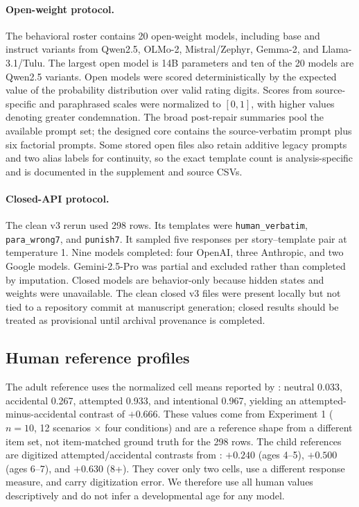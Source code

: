 \paragraph{Open-weight protocol.}
The behavioral roster contains 20 open-weight models, including base and instruct variants from Qwen2.5, OLMo-2, Mistral/Zephyr, Gemma-2, and Llama-3.1/Tulu.
The largest open model is 14B parameters and ten of the 20 models are Qwen2.5 variants.
Open models were scored deterministically by the expected value of the probability distribution over valid rating digits.
Scores from source-specific and paraphrased scales were normalized to $[0,1]$, with higher values denoting greater condemnation.
The broad post-repair summaries pool the available prompt set; the designed core contains the source-verbatim prompt plus six factorial prompts.
Some stored open files also retain additive legacy prompts and two alias labels for continuity, so the exact template count is analysis-specific and is documented in the supplement and source CSVs.

\paragraph{Closed-API protocol.}
The clean v3 rerun used 298 rows.
Its templates were \texttt{human\_verbatim}, \texttt{para\_wrong7}, and \texttt{punish7}.
It sampled five responses per story--template pair at temperature 1.
Nine models completed: four OpenAI, three Anthropic, and two Google models.
Gemini-2.5-Pro was partial and excluded rather than completed by imputation.
Closed models are behavior-only because hidden states and weights were unavailable.
The clean closed v3 files were present locally but not tied to a repository commit at manuscript generation; closed results should be treated as provisional until archival provenance is completed.

\subsection{Human reference profiles}

The adult reference uses the normalized cell means reported by \citet{young2007neural}: neutral 0.033, accidental 0.267, attempted 0.933, and intentional 0.967, yielding an attempted-minus-accidental contrast of $+0.666$.
These values come from Experiment 1 ($n=10$, 12 scenarios $\times$ four conditions) and are a reference shape from a different item set, not item-matched ground truth for the 298 rows.
The child references are digitized attempted/accidental contrasts from \citet{cushman2013development}: $+0.240$ (ages 4--5), $+0.500$ (ages 6--7), and $+0.630$ (8+).
They cover only two cells, use a different response measure, and carry digitization error.
We therefore use all human values descriptively and do not infer a developmental age for any model.

